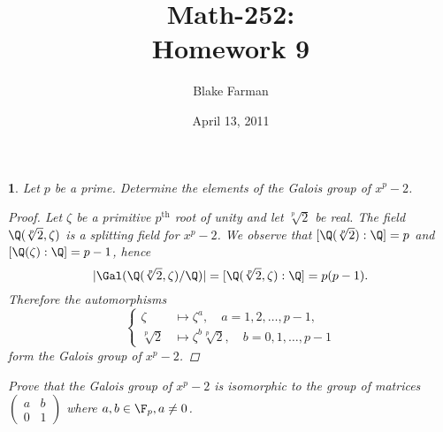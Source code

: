 \documentclass[10pt]{amsart}
\author{Blake Farman}
\title{Math-252:\\Homework 9}
\date{April 13, 2011}
\begin{document}
\maketitle

\newtheorem{thm}{}

\begin{thm}
  \label{Ex1}
  \newcommand{\rt}{\sqrt[p]{2}}
  Let $p$ be a prime.
  Determine the elements of the Galois group of $x^p - 2$.
  
  \begin{proof}
    Let $\zeta$ be a primitive $p^{\text{th}}$ root of unity and let $\rt$ be real.
    The field $\Q(\rt,\zeta)$ is a splitting field for $x^p - 2$.
    We observe that $[\Q(\rt):\Q] = p$ and $[\Q(\zeta):\Q] = p-1$, hence $$|\Gal(\Q(\rt,\zeta)/\Q)| =[\Q(\rt,\zeta):\Q] = p(p-1).$$
    Therefore the automorphisms 
    $$
    \begin{cases}
      \zeta &\longmapsto \zeta^a, \quad a = 1, 2, \ldots, p-1,\\
      \rt &\longmapsto \zeta^b\rt, \quad b = 0,1,\ldots,p-1
    \end{cases}
    $$
    form the Galois group of $x^p - 2$.
  \end{proof}
  
  Prove that the Galois group of $x^p - 2$ is isomorphic to the group of matrices 
  $
  \begin{pmatrix}
    a & b\\
    0 & 1
  \end{pmatrix}
  $
  where $a,b \in \F_p, a \neq 0$. 


\end{thm}
\end{document}
